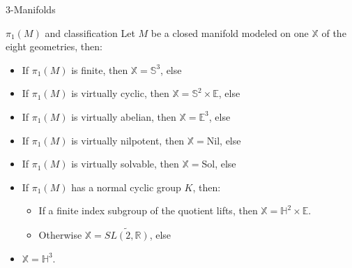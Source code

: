 \documentclass{beamer}
\begin{document}
\begin{section}{3-Manifolds}
\begin{frame}{$\pi_1(M)$ and classification}
    Let $M$ be a closed manifold modeled on one $\mathbb{X}$ of the eight geometries, then: 
    \begin{itemize}
        \item If $\pi_1(M)$ is finite, then $\mathbb{X}=\mathbb{S}^3$, else
        \item If $\pi_1(M)$ is virtually cyclic, then $\mathbb{X}=\mathbb{S}^2\times \mathbb{E}$, else
        \item If $\pi_1(M)$ is virtually abelian, then $\mathbb{X}=\mathbb{E}^3$, else
        \item If $\pi_1(M)$ is virtually nilpotent, then $\mathbb{X}=$Nil, else
        \item If $\pi_1(M)$ is virtually solvable, then $\mathbb{X}=$Sol, else
        \item If $\pi_1(M)$ has a normal cyclic group $K$, then:
        \begin{itemize}
            \item If a finite index subgroup of the quotient lifts, then $\mathbb{X}=\mathbb{H}^2\times \mathbb{E}$.
            \item Otherwise $\mathbb{X}=\widetilde{SL(2,\mathbb{R})}$, else
        \end{itemize}{}
        \item $\mathbb{X}=\mathbb{H}^3$.
    \end{itemize}{}
\end{frame}{}



\end{section}
\end{document}
